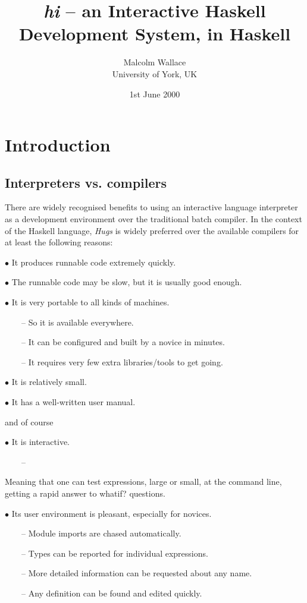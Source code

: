 \documentclass[a4paper]{article}
\title{{\em hi} -- an Interactive Haskell Development System, in Haskell}
\author{Malcolm Wallace \\ University of York, UK}
\date{1st June 2000}
\begin{document}
\maketitle


\section{Introduction}

\subsection{Interpreters vs. compilers}

There are widely recognised benefits to using an interactive language
interpreter as a development environment over the traditional batch
compiler.  In the context of the Haskell language, {\em Hugs} is widely
preferred over the available compilers for at least the following
reasons:

$\bullet$  It produces runnable code extremely quickly.

$\bullet$  The runnable code may be slow, but it is usually good enough.

$\bullet$  It is very portable to all kinds of machines.

\ \ \ \ --
           So it is available everywhere.

\ \ \ \ --
           It can be configured and built by a novice in minutes.

\ \ \ \ --
           It requires very few extra libraries/tools to get going.

$\bullet$ It is relatively small.

$\bullet$ It has a well-written user manual.

\noindent
and of course

$\bullet$
    It is interactive.

\ \ \ \ --
      \parbox[t]{150mm}{
        Meaning that one can test expressions, large or small,
        at the command line, getting a rapid answer to whatif? questions.}

$\bullet$
    Its user environment is pleasant, especially for novices.

\ \ \ \ --
      Module imports are chased automatically.

\ \ \ \ --
      Types can be reported for individual expressions.

\ \ \ \ --
      More detailed information can be requested about any name.

\ \ \ \ --
      Any definition can be found and edited quickly.
\end{document}
